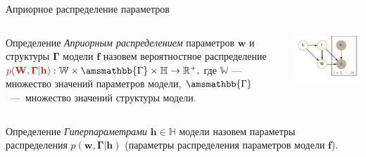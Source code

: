 \documentclass[usenames,dvipsnames,11pt,pdf,utf8,russian,aspectratio=43]{beamer}
\begin{document}
\begin{frame}{Априорное распределение параметров}
\footnotesize   
\begin{columns}
\begin{column}{0.6\textwidth}
   \begin{block}{Определение}
\textit{Априорным распределением} параметров $\mathbf{w}$ и структуры  $\boldsymbol{\Gamma}$ модели $\mathbf{f}$ назовем вероятностное распределение
$
    \textcolor{red}{p(\mathbf{W}, \boldsymbol{\Gamma}|\mathbf{h})}: \mathbb{W} \times \amsmathbb{\Gamma} \times \mathbb{H} \to \mathbb{R}^{+}, 
$
где $\mathbb{W}$ --- множество значений параметров модели, $\amsmathbb{\Gamma}$~---~множество значений структуры модели.
\end{block}

\end{column}
\begin{column}{0.4\textwidth}  %
    \begin{center}
     \includegraphics[width=\textwidth]{simple_plate.pdf}
     \end{center}
\end{column}
\end{columns}
\vspace*{-0.5cm}
\begin{block}{Определение}
\textit{Гиперпараметрами} $\mathbf{h}\in \mathbb{H}$ модели  назовем параметры распределения $p(\mathbf{w}, \boldsymbol{\Gamma}|\mathbf{h})$ (параметры распределения параметров модели $\mathbf{f}$).
 

\end{block}
\end{frame}
\end{document}
